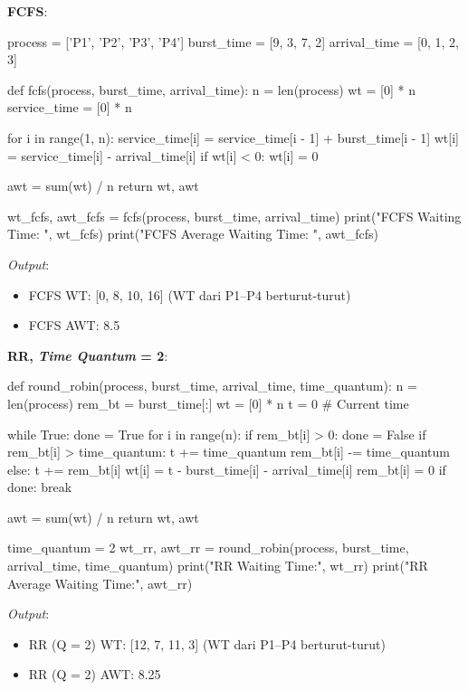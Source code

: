 \documentclass[12pt]{article}
\begin{document}
\textbf{FCFS}:
\begin{python}
process = ['P1', 'P2', 'P3', 'P4']
burst_time = [9, 3, 7, 2]
arrival_time = [0, 1, 2, 3]

def fcfs(process, burst_time, arrival_time):
    n = len(process)
    wt = [0] * n
    service_time = [0] * n
    
    for i in range(1, n):
        service_time[i] = service_time[i - 1] + burst_time[i - 1]
        wt[i] = service_time[i] - arrival_time[i]
        if wt[i] < 0:
            wt[i] = 0
    
    awt = sum(wt) / n
    return wt, awt

wt_fcfs, awt_fcfs = fcfs(process, burst_time, arrival_time)
print("FCFS Waiting Time: ", wt_fcfs)
print("FCFS Average Waiting Time: ", awt_fcfs)
\end{python}
\textit{Output}:
\begin{itemize}
    \item FCFS WT: [0, 8, 10, 16] (WT dari P1–P4 berturut-turut)
    \item FCFS AWT: 8.5
\end{itemize}

\textbf{RR, \textit{Time Quantum} = 2}:
\begin{python}
def round_robin(process, burst_time, arrival_time, time_quantum):
    n = len(process)
    rem_bt = burst_time[:]
    wt = [0] * n
    t = 0  # Current time
    
    while True:
        done = True
        for i in range(n):
            if rem_bt[i] > 0:
                done = False
                if rem_bt[i] > time_quantum:
                    t += time_quantum
                    rem_bt[i] -= time_quantum
                else:
                    t += rem_bt[i]
                    wt[i] = t - burst_time[i] - arrival_time[i]
                    rem_bt[i] = 0
        if done:
            break
    
    awt = sum(wt) / n
    return wt, awt

time_quantum = 2
wt_rr, awt_rr = round_robin(process, burst_time, arrival_time, time_quantum)
print("RR Waiting Time:", wt_rr)
print("RR Average Waiting Time:", awt_rr)
\end{python}
\textit{Output}:
\begin{itemize}
    \item RR (Q = 2) WT: [12, 7, 11, 3] (WT dari P1–P4 berturut-turut)
    \item RR (Q = 2) AWT: 8.25
\end{itemize}
\end{document}
